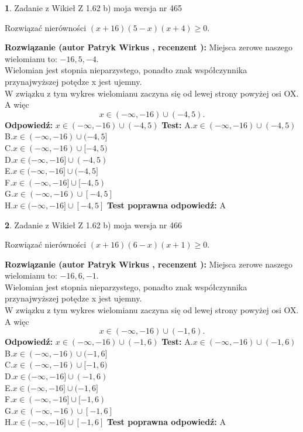 \documentclass[12pt, a4paper]{article}
\theoremstyle{definition} %
\newtheorem{zad}{}
\newcommand{\zadStart}[1]{\begin{zad}#1\newline}
\newcommand{\zadStop}{\end{zad}}
\newcommand{\rozwStart}[2]{\noindent \textbf{Rozwiązanie (autor #1 , recenzent #2): }\newline}
\newcommand{\rozwStop}{\newline}
\newcommand{\odpStart}{\noindent \textbf{Odpowiedź:}\newline}
\newcommand{\odpStop}{\newline}
\newcommand{\testStart}{\noindent \textbf{Test:}\newline}
\newcommand{\testStop}{\newline}
\newcommand{\kluczStart}{\noindent \textbf{Test poprawna odpowiedź:}\newline}
\newcommand{\kluczStop}{\newline}
\begin{document}
\zadStart{Zadanie z Wikieł Z 1.62 b) moja wersja nr 465}

Rozwiązać nierówności $(x+16)(5-x)(x+4)\ge0$.
\zadStop
\rozwStart{Patryk Wirkus}{}
Miejsca zerowe naszego wielomianu to: $-16, 5, -4$.\\
Wielomian jest stopnia nieparzystego, ponadto znak współczynnika przy\linebreak najwyższej potędze x jest ujemny.\\ W związku z tym wykres wielomianu zaczyna się od lewej strony powyżej osi OX. A więc $$x \in (-\infty,-16) \cup (-4,5).$$
\rozwStop
\odpStart
$x \in (-\infty,-16) \cup (-4,5)$
\odpStop
\testStart
A.$x \in (-\infty,-16) \cup (-4,5)$\\
B.$x \in (-\infty,-16) \cup (-4,5]$\\
C.$x \in (-\infty,-16) \cup [-4,5)$\\
D.$x \in (-\infty,-16] \cup (-4,5)$\\
E.$x \in (-\infty,-16] \cup (-4,5]$\\
F.$x \in (-\infty,-16] \cup [-4,5)$\\
G.$x \in (-\infty,-16) \cup [-4,5]$\\
H.$x \in (-\infty,-16] \cup [-4,5]$
\testStop
\kluczStart
A
\kluczStop



\zadStart{Zadanie z Wikieł Z 1.62 b) moja wersja nr 466}

Rozwiązać nierówności $(x+16)(6-x)(x+1)\ge0$.
\zadStop
\rozwStart{Patryk Wirkus}{}
Miejsca zerowe naszego wielomianu to: $-16, 6, -1$.\\
Wielomian jest stopnia nieparzystego, ponadto znak współczynnika przy\linebreak najwyższej potędze x jest ujemny.\\ W związku z tym wykres wielomianu zaczyna się od lewej strony powyżej osi OX. A więc $$x \in (-\infty,-16) \cup (-1,6).$$
\rozwStop
\odpStart
$x \in (-\infty,-16) \cup (-1,6)$
\odpStop
\testStart
A.$x \in (-\infty,-16) \cup (-1,6)$\\
B.$x \in (-\infty,-16) \cup (-1,6]$\\
C.$x \in (-\infty,-16) \cup [-1,6)$\\
D.$x \in (-\infty,-16] \cup (-1,6)$\\
E.$x \in (-\infty,-16] \cup (-1,6]$\\
F.$x \in (-\infty,-16] \cup [-1,6)$\\
G.$x \in (-\infty,-16) \cup [-1,6]$\\
H.$x \in (-\infty,-16] \cup [-1,6]$
\testStop
\kluczStart
A
\kluczStop
\end{document}
